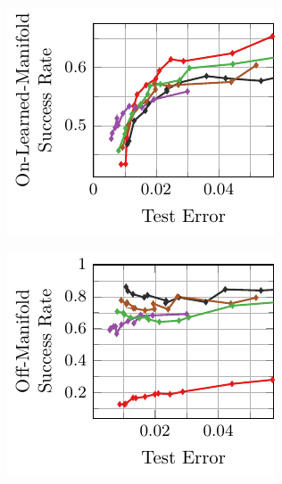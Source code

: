 \begin{appendix}
\begin{figure}[t]
    \begin{subfigure}{0.235\textwidth}
        \centering
        \includegraphics[width=\textwidth]{appendix_l2_emnist_error_on_learned_cw.pdf}
    \end{subfigure}
    \begin{subfigure}{0.235\textwidth}
        \centering
        \includegraphics[width=\textwidth]{appendix_l2_emnist_error_off_cw.pdf}
    \end{subfigure}
    \\

\end{figure}
\end{appendix}
